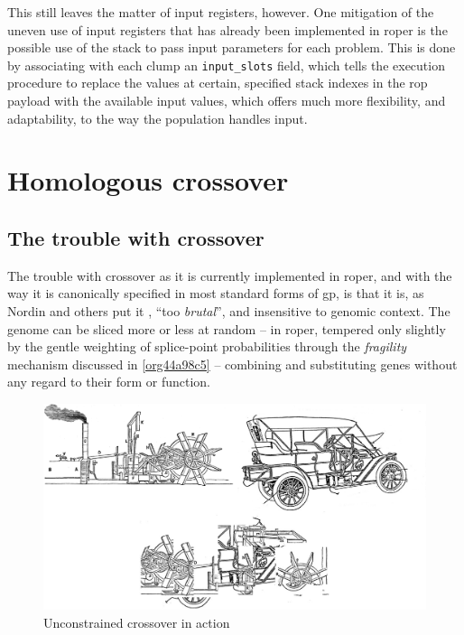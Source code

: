 \documentclass[12pt,glossary]{dalthesis}
\begin{document}
This still leaves the matter of input registers, however. One mitigation of the uneven use of
input registers that has already been implemented in \gls{roper} is the possible use of the
stack to pass input parameters for each problem. This is done by associating with each
clump an \texttt{input\_slots} field, which tells the execution procedure to replace the values at
certain, specified stack indexes in the \gls{rop} payload with the available input values, which
offers much more flexibility, and adaptability, to the way the population handles input. 

\section{Homologous crossover}
\label{sec:org4232118}
\label{org6eec0ab}
\subsection{The trouble with crossover}
\label{sec:orgc7b7def}
The trouble with crossover as it is currently implemented in \gls{roper}, and with
the way it is canonically specified in most standard forms of \gls{gp},
is that it is, as Nordin and others put it \cite{nordin99}, ``too \emph{brutal}'', and
insensitive to genomic context. The genome can be sliced more or less at random --
in \gls{roper}, tempered only slightly by the gentle weighting of splice-point probabilities
through the \emph{fragility} mechanism discussed in \ref{org44a98c5} -- combining and substituting
genes without any regard to their form or function.

\begin{figure}[htbp]
\centering
\includegraphics[width=.9\linewidth]{../images/carboat-montage.png}
\caption{\label{fig:org7383ffb}
Unconstrained crossover in action}
\end{figure}
\end{document}
